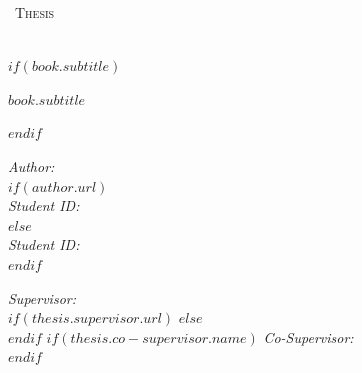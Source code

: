 \frontmatter %

\pagestyle{plain} %


\begin{titlepage}
\begin{center}

\vspace*{.06\textheight}
{\scshape\huge \univname\par}\vspace{1.5cm} %
\textsc{\Large \degreename\ Thesis}\\[0.5cm] %

\HRule \\[0.4cm] %
{\LARGE \bfseries \ttitle\par}\vspace{0.2cm} %
$if(book.subtitle)$
{\normalsize\bfseries $book.subtitle$\par}\vspace{0.2cm} %
$endif$
\HRule \\[1.5cm] %
 
\begin{minipage}[t]{0.4\textwidth}
\begin{flushleft} \normalsize
\emph{Author:}\\
$if(author.url)$
\href{$author.url$}{\authorname}\\[0.3cm] %
\emph{Student ID:}\\
\thesistudentid
$else$
\authorname\\[0.3cm]
\emph{Student ID:}\\
\thesistudentid
$endif$
\end{flushleft}
\end{minipage}
\begin{minipage}[t]{0.4\textwidth}
\begin{flushright} \normalsize
\emph{Supervisor:} \\
$if(thesis.supervisor.url)$%
\href{$thesis.supervisor.url$}{\supname} %
$else$%
\supname\\[0.3cm]
$endif$
$if(thesis.co-supervisor.name)$
\emph{Co-Supervisor:}\\
\cosupname
$endif$
\end{flushright}
\end{minipage}\\[3cm]
 

\end{center}
\end{titlepage}
